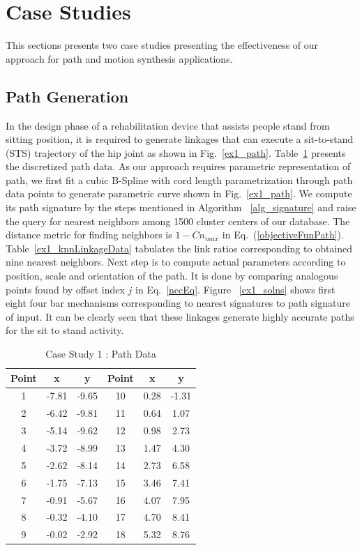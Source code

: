 \documentclass[twocolumn,10pt]{asme2ej}
\newcommand{\req}[1]{(\ref{#1})}
\begin{document}
\section{Case Studies}\label{sec_example}
This sections presents two case studies presenting the effectiveness of our approach for path and motion synthesis applications.
\subsection{Path Generation}
In the design phase of a rehabilitation device that assists people stand from sitting position, it is required to generate linkages that can execute a sit-to-stand (STS) trajectory of the hip joint as shown in Fig.~\ref{ex1_path}.
Table~\ref{hipPathTab} presents the discretized path data.
As our approach requires parametric representation of path, we first fit a cubic B-Spline with cord length parametrization through path data points to generate parametric curve shown in Fig.~\ref{ex1_path}.
We compute its path signature by the steps mentioned in Algorithm ~\ref{alg_signature} and raise the query for nearest neighbors among 1500 cluster centers of our database.
The distance metric for finding neighbors is $1-Cn_{max}$ in Eq.~\req{objectiveFunPath}.
Table~\ref{ex1_knnLinkageData} tabulates the link ratios corresponding to obtained nine nearest neighbors.
Next step is to compute actual parameters according to position, scale and orientation of the path.
It is done by comparing analogous points found by offset index $j$ in Eq.~\ref{nccEq}.
Figure ~\ref{ex1_solns} shows first eight four bar mechanisms corresponding to nearest signatures to path signature of input.
It can be clearly seen that these linkages generate highly accurate paths for the sit to stand activity.

\begin{table}
\caption{Case Study 1 : Path Data}
\centering
\label{hipPathTab}
\begin{tabular}{cccccc}
\hline
Point & x & y & Point & x & y \\
\hline
1 & -7.81 & -9.65 & 10 & 0.28 & -1.31 \\
2 & -6.42 & -9.81 & 11 & 0.64 & 1.07 \\
3 & -5.14 & -9.62 & 12 & 0.98 & 2.73 \\
4 & -3.72 & -8.99 & 13 & 1.47 & 4.30 \\
5 & -2.62 & -8.14 & 14 & 2.73 & 6.58 \\
6 & -1.75 & -7.13 & 15 & 3.46 & 7.41 \\
7 & -0.91 & -5.67 & 16 & 4.07 & 7.95 \\
8 & -0.32 & -4.10 & 17 & 4.70 & 8.41 \\
9 & -0.02 & -2.92 & 18 & 5.32 & 8.76 \\
\end{tabular}
\end{table}
\end{document}
